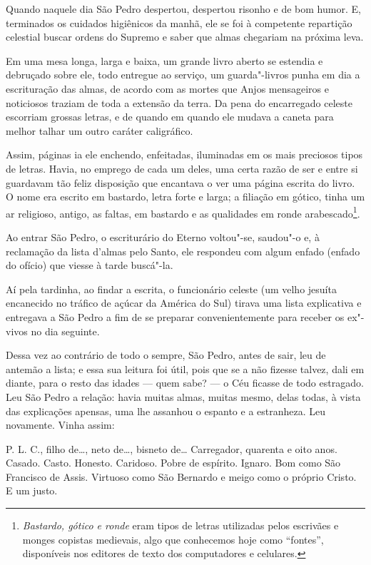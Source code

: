 Quando naquele dia São Pedro despertou, despertou risonho e de bom
humor. E, terminados os cuidados higiênicos da manhã, ele se foi à
competente repartição celestial buscar ordens do Supremo e saber que
almas chegariam na próxima leva.

Em uma mesa longa, larga e baixa, um grande livro aberto se estendia e
debruçado sobre ele, todo entregue ao serviço, um guarda"-livros punha em
dia a escrituração das almas, de acordo com as mortes que Anjos
mensageiros e noticiosos traziam de toda a extensão da terra. Da pena do
encarregado celeste escorriam grossas letras, e de quando em quando ele
mudava a caneta para melhor talhar um outro caráter caligráfico.

Assim, páginas ia ele enchendo, enfeitadas, iluminadas em os mais
preciosos tipos de letras. Havia, no emprego de cada um deles, uma certa
razão de ser e entre si guardavam tão feliz disposição que encantava o
ver uma página escrita do livro. O nome era escrito em bastardo, letra
forte e larga; a filiação em gótico, tinha um ar religioso, antigo, as
faltas, em bastardo e as qualidades em ronde arabescado\footnote{\emph{Bastardo,
  gótico e ronde} eram tipos de letras utilizadas pelos escrivães e
  monges copistas medievais, algo que conhecemos hoje como ``fontes'',
  disponíveis nos editores de texto dos computadores e celulares.}.

Ao entrar São Pedro, o escriturário do Eterno voltou"-se, saudou"-o e, à
reclamação da lista d'almas pelo Santo, ele respondeu com algum enfado
(enfado do ofício) que viesse à tarde buscá"-la.

Aí pela tardinha, ao findar a escrita, o funcionário celeste (um velho
jesuíta encanecido no tráfico de açúcar da América do Sul) tirava uma
lista explicativa e entregava a São Pedro a fim de se preparar
convenientemente para receber os ex"-vivos no dia seguinte.

Dessa vez ao contrário de todo o sempre, São Pedro, antes de sair, leu
de antemão a lista; e essa sua leitura foi útil, pois que se a não
fizesse talvez, dali em diante, para o resto das idades --- quem sabe? ---
o Céu ficasse de todo estragado. Leu São Pedro a relação: havia muitas
almas, muitas mesmo, delas todas, à vista das explicações apensas, uma
lhe assanhou o espanto e a estranheza. Leu novamente. Vinha assim:

P. L. C., filho de\ldots{}, neto de\ldots{}, bisneto de\ldots{} Carregador, quarenta e
oito anos. Casado. Casto. Honesto. Caridoso. Pobre de espírito. Ignaro.
Bom como São Francisco de Assis. Virtuoso como São Bernardo e meigo como
o próprio Cristo. E um justo.

